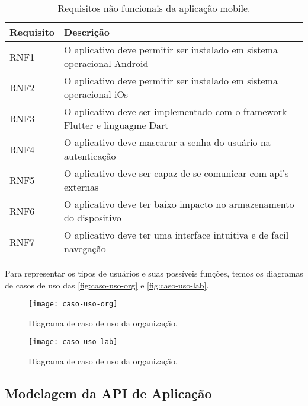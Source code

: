 \begin{table}[htb]
  \caption{Requisitos não funcionais da aplicação mobile.}
  \label{tab:requisitos_nao_funcionais_app}
  \begin{tabularx}{\textwidth}{l|l}
    \hline
    \textbf{Requisito} & \textbf{Descrição}                                                          \\ \hline
    RNF1               & O aplicativo deve permitir ser instalado em sistema operacional Android     \\
    RNF2               & O aplicativo deve permitir ser instalado em sistema operacional iOs         \\
    RNF3               & O aplicativo deve ser implementado com o framework Flutter e linguagme Dart \\
    RNF4               & O aplicativo deve mascarar a senha do usuário na autenticação               \\
    RNF5               & O aplicativo deve ser capaz de se comunicar com \gls{api}'s externas        \\
    RNF6               & O aplicativo deve ter baixo impacto no armazenamento do dispositivo         \\
    RNF7               & O aplicativo deve ter uma interface intuitiva e de facil navegação          \\ \hline
  \end{tabularx}
  \fonte{}
\end{table}

Para representar os tipos de usuários e suas possíveis funções, temos os diagramas de casos de uso das \autoref{fig:caso-uso-org} e \autoref{fig:caso-uso-lab}.

\begin{figure}[htb]
  \captionsetup{width=0.43\textwidth}
  \caption{Diagrama de caso de uso da organização.}
  \label{fig:caso-uso-org}
  \texttt{[image: caso-uso-org]}
  \fonte{}
\end{figure}

\begin{figure}[htb]
  \captionsetup{width=0.43\textwidth}
  \caption{Diagrama de caso de uso da organização.}
  \label{fig:caso-uso-lab}
  \texttt{[image: caso-uso-lab]}
  \fonte{}
\end{figure}

\subsection{Modelagem da API de Aplicação}\label{subsec:modelagem_api}


